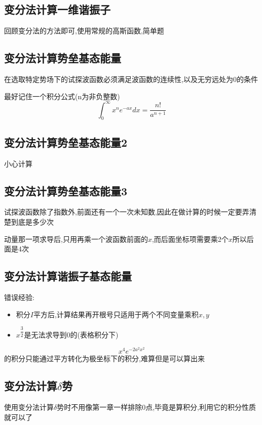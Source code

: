 \documentclass{article}
\begin{document}
        \subsection{变分法计算一维谐振子}
            回顾变分法的方法即可,使用常规的高斯函数,简单题
        
        \subsection{变分法计算势垒基态能量}
            \begin{formal}
                在选取特定势场下的试探波函数必须满足波函数的连续性,以及无穷远处为0的条件

                最好记住一个积分公式(n为非负整数)
                $$ \int_{0}^{\infty} x^{n} e^{-ax} dx  = \dfrac{n!}{a^{n+1}} $$
            \end{formal}
        
        
        \subsection{变分法计算势垒基态能量2}
            小心计算


        \subsection{变分法计算势垒基态能量3}
            试探波函数除了指数外,前面还有一个一次未知数,因此在做计算的时候一定要弄清楚到底是多少次

            动量那一项求导后,只用再乘一个波函数前面的$x$,而后面坐标项需要乘2个$x$所以后面是4次

        \subsection{变分法计算谐振子基态能量}
            错误经验:
            \begin{itemize}
                \item 积分$I$平方后,计算结果再开根号只适用于两个不同变量乘积$x , y$
                \item $x^{\dfrac{3}{2}}$是无法求导到0的(表格积分下)
            \end{itemize}
        $$ x^{4} e^{-2a^{2}x^{2}} $$的积分只能通过平方转化为极坐标下的积分,难算但是可以算出来
    
            
        
        \subsection{变分法计算\texorpdfstring{$\delta$}{}势}
            使用变分法计算$\delta$势时不用像第一章一样排除0点,毕竟是算积分,利用它的积分性质就可以了      
            
\end{document}
